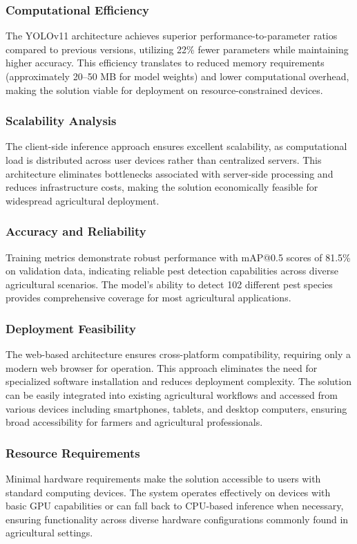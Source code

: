\subsubsection{Computational Efficiency}
The YOLOv11 architecture achieves superior performance-to-parameter ratios compared to previous versions, utilizing 22\% fewer parameters while maintaining higher accuracy. This efficiency translates to reduced memory requirements (approximately 20--50 MB for model weights) and lower computational overhead, making the solution viable for deployment on resource-constrained devices.

\subsubsection{Scalability Analysis}
The client-side inference approach ensures excellent scalability, as computational load is distributed across user devices rather than centralized servers. This architecture eliminates bottlenecks associated with server-side processing and reduces infrastructure costs, making the solution economically feasible for widespread agricultural deployment.

\subsubsection{Accuracy and Reliability}
Training metrics demonstrate robust performance with mAP@0.5 scores of 81.5\% on validation data, indicating reliable pest detection capabilities across diverse agricultural scenarios. The model's ability to detect 102 different pest species provides comprehensive coverage for most agricultural applications.

\subsubsection{Deployment Feasibility}
The web-based architecture ensures cross-platform compatibility, requiring only a modern web browser for operation. This approach eliminates the need for specialized software installation and reduces deployment complexity. The solution can be easily integrated into existing agricultural workflows and accessed from various devices including smartphones, tablets, and desktop computers, ensuring broad accessibility for farmers and agricultural professionals.

\subsubsection{Resource Requirements}
Minimal hardware requirements make the solution accessible to users with standard computing devices. The system operates effectively on devices with basic GPU capabilities or can fall back to CPU-based inference when necessary, ensuring functionality across diverse hardware configurations commonly found in agricultural settings.
